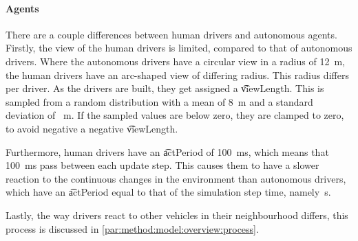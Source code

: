 

\paragraph{Agents}
There are a couple differences between human drivers and autonomous agents. Firstly, the view of the human drivers is limited, compared to that of autonomous drivers. Where the autonomous drivers have a circular view in a radius of \si{12 \meter}, the human drivers have an arc-shaped view of differing radius. This radius differs per driver. As the drivers are built, they get assigned a \t{viewLength}. This is sampled from a random distribution with a mean of \si{8 \meter} and a standard deviation of \si{ \meter}. If the sampled values are below zero, they are clamped to zero, to avoid negative a negative \t{viewLength}. 

Furthermore, human drivers have an \t{actPeriod} of \si{100\milli\second}, which means that \si{100\milli\second} pass between each update step. This causes them to have a slower reaction to the continuous changes in the environment than autonomous drivers, which have an \t{actPeriod} equal to that of the simulation step time, namely\si{\second}. 

Lastly, the way drivers react to other vehicles in their neighbourhood differs, this process is discussed in  \cref{par:method:model:overview:process}. 



